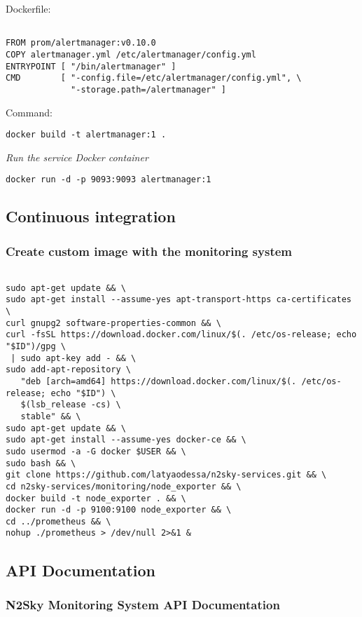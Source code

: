 Dockerfile:
 \begin{lstlisting}

FROM prom/alertmanager:v0.10.0
COPY alertmanager.yml /etc/alertmanager/config.yml
ENTRYPOINT [ "/bin/alertmanager" ]
CMD        [ "-config.file=/etc/alertmanager/config.yml", \
             "-storage.path=/alertmanager" ]

\end{lstlisting}

Command: 

 \begin{lstlisting}
docker build -t alertmanager:1 .
\end{lstlisting}


\emph{Run the service Docker container}
 \begin{lstlisting}
docker run -d -p 9093:9093 alertmanager:1
\end{lstlisting}



\subsection{Continuous integration}\label{Continuous integration}

\subsubsection{Create custom image with the monitoring system}\label{Custom image with the monitoring system}

 \begin{lstlisting}

sudo apt-get update && \
sudo apt-get install --assume-yes apt-transport-https ca-certificates \
curl gnupg2 software-properties-common && \
curl -fsSL https://download.docker.com/linux/$(. /etc/os-release; echo "$ID")/gpg \
 | sudo apt-key add - && \
sudo add-apt-repository \
   "deb [arch=amd64] https://download.docker.com/linux/$(. /etc/os-release; echo "$ID") \
   $(lsb_release -cs) \
   stable" && \
sudo apt-get update && \
sudo apt-get install --assume-yes docker-ce && \
sudo usermod -a -G docker $USER && \
sudo bash && \
git clone https://github.com/latyaodessa/n2sky-services.git && \
cd n2sky-services/monitoring/node_exporter && \
docker build -t node_exporter . && \
docker run -d -p 9100:9100 node_exporter && \
cd ../prometheus && \
nohup ./prometheus > /dev/null 2>&1 &

\end{lstlisting}


\subsection{API Documentation}\label{API Documentation}
\subsubsection{N2Sky Monitoring System API Documentation}\label{N2Sky Monitoring System API Documentation}

